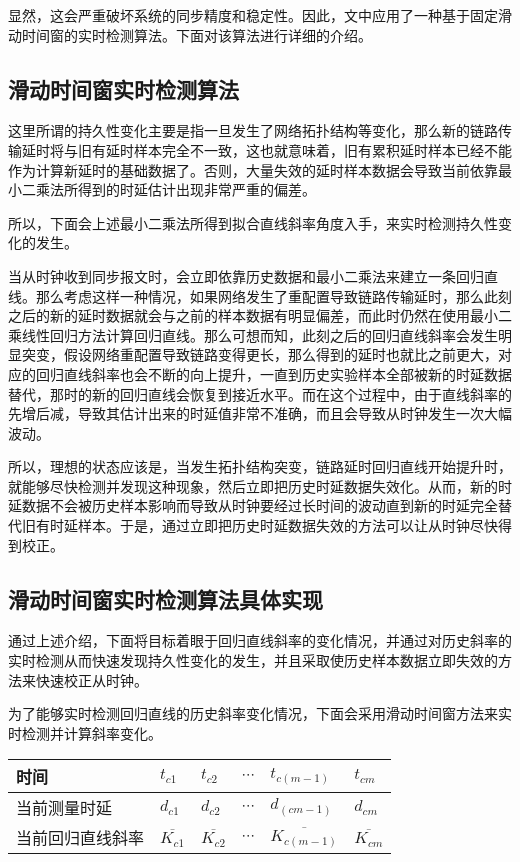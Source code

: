 显然，这会严重破坏系统的同步精度和稳定性。因此，文中应用了一种基于固定滑动时间窗的实时检测算法。下面对该算法进行详细的介绍。

\subsection{滑动时间窗实时检测算法}
这里所谓的持久性变化主要是指一旦发生了网络拓扑结构等变化，那么新的链路传输延时将与旧有延时样本完全不一致，这也就意味着，旧有累积延时样本已经不能作为计算新延时的基础数据了。否则，大量失效的延时样本数据会导致当前依靠最小二乘法所得到的时延估计出现非常严重的偏差。

所以，下面会上述最小二乘法所得到拟合直线斜率角度入手，来实时检测持久性变化的发生。

当从时钟收到同步报文时，会立即依靠历史数据和最小二乘法来建立一条回归直线。那么考虑这样一种情况，如果网络发生了重配置导致链路传输延时，那么此刻之后的新的延时数据就会与之前的样本数据有明显偏差，而此时仍然在使用最小二乘线性回归方法计算回归直线。那么可想而知，此刻之后的回归直线斜率会发生明显突变，假设网络重配置导致链路变得更长，那么得到的延时也就比之前更大，对应的回归直线斜率也会不断的向上提升，一直到历史实验样本全部被新的时延数据替代，那时的新的回归直线会恢复到接近水平。而在这个过程中，由于直线斜率的先增后减，导致其估计出来的时延值非常不准确，而且会导致从时钟发生一次大幅波动。

所以，理想的状态应该是，当发生拓扑结构突变，链路延时回归直线开始提升时，就能够尽快检测并发现这种现象，然后立即把历史时延数据失效化。从而，新的时延数据不会被历史样本影响而导致从时钟要经过长时间的波动直到新的时延完全替代旧有时延样本。于是，通过立即把历史时延数据失效的方法可以让从时钟尽快得到校正。

\subsection{滑动时间窗实时检测算法具体实现}
通过上述介绍，下面将目标着眼于回归直线斜率的变化情况，并通过对历史斜率的实时检测从而快速发现持久性变化的发生，并且采取使历史样本数据立即失效的方法来快速校正从时钟。

为了能够实时检测回归直线的历史斜率变化情况，下面会采用滑动时间窗方法来实时检测并计算斜率变化。
\begin{table}[!hpb]
  \centering
  \begin{tabular}{llllll} \toprule
  	时间 & $t_{c1}$ & $t_{c2}$ & $\cdots$ & $t_{c(m-1)}$ & $t_{cm}$ \\ \midrule
    当前测量时延 & $d_{c1}$ & $d_{c2}$ & $\cdots$ & $d_{(cm-1)}$ & $d_{cm}$ \\ \midrule
    当前回归直线斜率 & $\overline{K_{c1}}$ & $\overline{K_{c2}}$ & $\cdots$ & $\overline{K_{c(m-1)}}$ & $\overline{K_{cm}}$  \\ \bottomrule
  \end{tabular}
\end{table}

